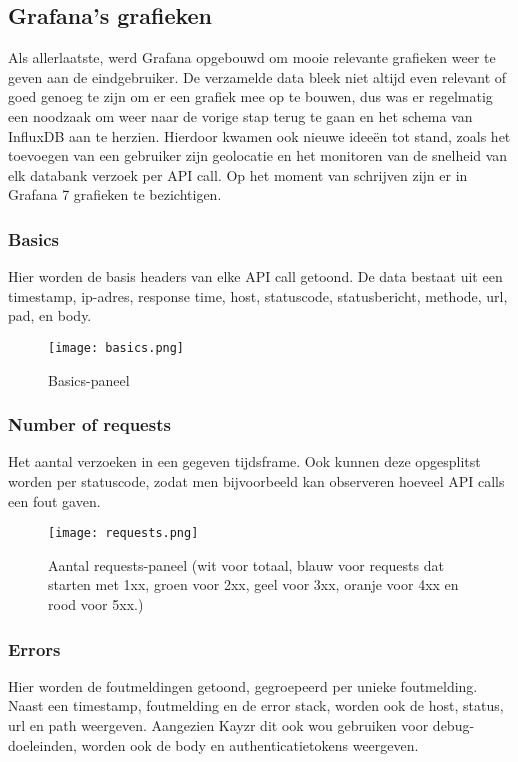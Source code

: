 \subsection{Grafana's grafieken}
\label{sec:graphs}

Als allerlaatste, werd Grafana opgebouwd om mooie relevante grafieken weer te geven aan de eindgebruiker. De verzamelde data bleek niet altijd even relevant of goed genoeg te zijn om er een grafiek mee op te bouwen, dus was er regelmatig een noodzaak om weer naar de vorige stap terug te gaan en het schema van InfluxDB aan te herzien. Hierdoor kwamen ook nieuwe ideeën tot stand, zoals het toevoegen van een gebruiker zijn geolocatie en het monitoren van de snelheid van elk databank verzoek per API call. Op het moment van schrijven zijn er in Grafana 7 grafieken te bezichtigen.

\subsubsection{Basics}
\label{sec:basics}
Hier worden de basis headers van elke API call getoond. De data bestaat uit een timestamp, ip-adres, response time, host, statuscode, statusbericht, methode, url, pad, en body. 

\begin{figure}[h]
	\centering
	\texttt{[image: basics.png]}
	\caption{Basics-paneel}
	\label{fig:basics}
\end{figure}

\subsubsection{Number of requests}
\label{sec:numberofrequests}
Het aantal verzoeken in een gegeven tijdsframe. Ook kunnen deze opgesplitst worden per statuscode, zodat men bijvoorbeeld kan observeren hoeveel API calls een fout gaven.

\begin{figure}[h]
	\centering
	\texttt{[image: requests.png]}
	\caption{Aantal requests-paneel (wit voor totaal, blauw voor requests dat starten met 1xx, groen voor 2xx, geel voor 3xx, oranje voor 4xx en rood voor 5xx.)}
	\label{fig:requests}
\end{figure}

\subsubsection{Errors}
\label{sec:errors}
Hier worden de foutmeldingen getoond, gegroepeerd per unieke foutmelding. Naast een timestamp, foutmelding en de error stack, worden ook de host, status, url en path weergeven. Aangezien Kayzr dit ook wou gebruiken voor debug-doeleinden, worden ook de body en authenticatietokens weergeven.

